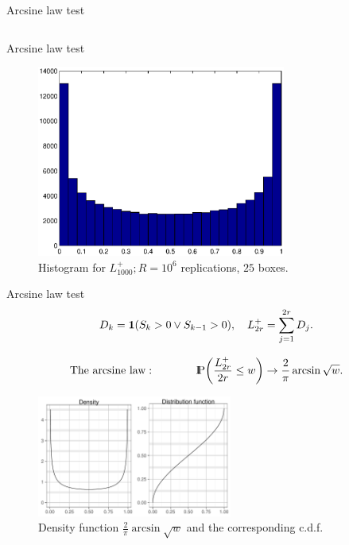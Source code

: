 \documentclass[aspectratio=169]{beamer}
\newcommand{\Prob}{{\rm I\hspace{-0.8mm}P}}
\begin{document}
\begin{frame}{Arcsine law test}
\begin{center}
\begin{tabular}{lllll}
\end{tabular}
\end{center}


\end{frame}



\begin{frame}{Arcsine law test}
\begin{figure}[h]
 \centering
 \includegraphics[height=6.3cm]{figures/arcsin.eps}
 \caption{Histogram for $L^{+}_{1000}; R=10^6$ replications, $25$ boxes.}
 \label{fig:arcsin}
\end{figure}

\end{frame}




\begin{frame}{Arcsine law test}
\[
D_k=\boldsymbol{1}{(S_k>0 \vee S_{k-1}>0)},\quad
L^+_{2r}=\sum_{j=1}^{2r}D_j.
\]

\[
\mathrm{The\ arcsine\ law:}\qquad\qquad \Prob\!\left(\frac{L^+_{2r}}{2r}\le w\right)
 \to \frac{2}{\pi}\arcsin\sqrt{w}.
\]

\begin{figure}[h]
 \centering
 \includegraphics[height=4cm]{figures/arcsine_dist_5x8.pdf}
 \caption{Density function \(\frac{2}{\pi} \arcsin\sqrt{w}\) and the corresponding c.d.f.}
 \label{fig:arcsine_distr}
\end{figure}

\end{frame}
\end{document}
